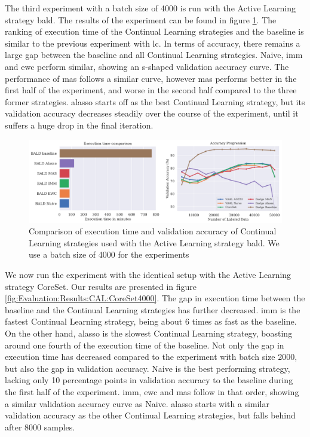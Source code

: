 The third experiment with a batch size of 4000 is run with the Active Learning strategy \gls{bald}. The results of the experiment can be found in figure \ref{fig:Evaluation:Results:CAL:BALD4000}. The ranking of execution time of the Continual
Learning strategies and the baseline is similar to the previous experiment with \gls{lc}. In terms of accuracy, there remains a large gap between the baseline and all Continual Learning strategies. Naive, \gls{imm} and \gls{ewc} perform similar, showing an
s-shaped validation accuracy curve. The performance of \gls{mas} follows a similar curve, however \gls{mas} performs better in the first half of the experiment, and worse in the second half compared to the three former strategies. \gls{alasso} starts off as
the best Continual Learning strategy, but its validation accuracy decreases steadily over the course of the experiment, until it suffers a huge drop in the final iteration. \par 

\begin{figure}[h]
    \centering
    \includegraphics[width=\linewidth]{images/results_CAL/Bald_CAL_4000b.png}
    \caption[Continual Active Learning \gls{bald} 4000 batch size]{Comparison of execution time and validation accuracy of Continual Learning strategies used with the Active Learning strategy
    \gls{bald}. We use a batch size of 4000 for the experiments }
    \label{fig:Evaluation:Results:CAL:BALD4000}
\end{figure}


We now run the experiment with the identical setup with the Active Learning strategy CoreSet. Our results are presented in figure \ref{fig:Evaluation:Results:CAL:CoreSet4000}. The gap in execution time between the baseline and the Continual Learning 
strategies has further decreased. \gls{imm} is the fastest Continual Learning strategy, being about 6 times as fast as the baseline. On the other hand, \gls{alasso} is the slowest Continual Learning strategy, boasting around one fourth of the execution time of the
baseline. Not only the gap in execution time has decreased compared to the experiment with batch size 2000, but also the gap in validation accuracy. Naive is the best performing strategy, lacking only 10 percentage points in validation accuracy to the
baseline during the first half of the experiment. \gls{imm}, \gls{ewc} and \gls{mas} follow in that order, showing a similar validation accuracy curve as Naive. \gls{alasso} starts with a similar validation accuracy as the other Continual Learning strategies, but falls behind
after 8000 samples. \par


